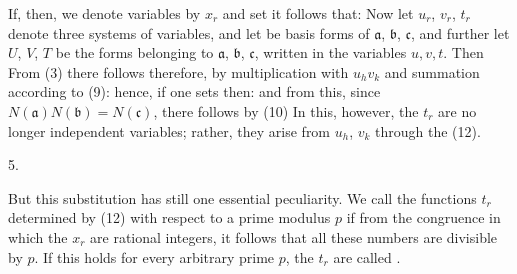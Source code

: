 If, then, we denote variables by $x_r$ and set
it follows that:
Now let $u_r$, $v_r$, $t_r$ denote three systems of variables, and let
be basis forms of $\mathfrak{a}$, $\mathfrak{b}$, $\mathfrak{c}$, and further let $U$, $V$, $T$ be the forms belonging to $\mathfrak{a}$, $\mathfrak{b}$, $\mathfrak{c}$, written in the variables $u,v,t$. Then
From (3) there follows therefore, by multiplication with $u_h v_k$ and summation according to (9):
hence, if one sets
then:
and from this, since $N(\mathfrak{a})N(\mathfrak{b}) = N(\mathfrak{c})$, there follows by (10)
In this, however, the $t_r$ are no longer independent variables; rather, they arise from $u_h$, $v_k$ through the  (12).

5. 

But this substitution has still one essential peculiarity. We call the functions $t_r$ determined by (12)  with respect to a prime modulus $p$ if from the congruence
in which the $x_r$ are rational integers, it follows that all these numbers are divisible by $p$. If this holds for every arbitrary prime $p$, the $t_r$ are called .
